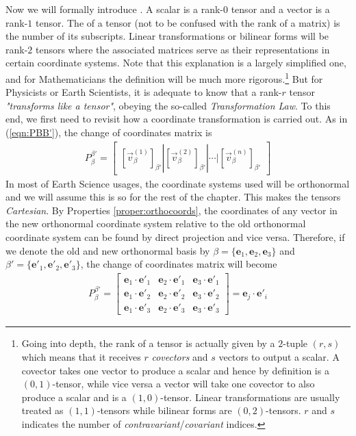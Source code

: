 Now we will formally introduce . A scalar is a rank-$0$ tensor and a vector is a rank-$1$ tensor. The  of a tensor (not to be confused with the rank of a matrix) is the number of its subscripts. Linear transformations or bilinear forms will be rank-$2$ tensors where the associated matrices serve as their representations in certain coordinate systems. Note that this explanation is a largely simplified one, and for Mathematicians the definition will be much more rigorous.\footnote{\label{foot:rstensor}Going into depth, the rank of a tensor is actually given by a $2$-tuple $(r,s)$ which means that it receives $r$ \textit{covectors} and $s$ vectors to output a scalar. A covector takes one vector to produce a scalar and hence by definition is a $(0,1)$-tensor, while vice versa a vector will take one covector to also produce a scalar and is a $(1,0)$-tensor. Linear transformations are usually treated as $(1,1)$-tensors while bilinear forms are $(0,2)$-tensors. $r$ and $s$ indicates the number of \textit{contravariant}/\textit{covariant} indices.} But for Physicists or Earth Scientists, it is adequate to know that a rank-$r$ tensor \textit{"transforms like a tensor"}, obeying the so-called \textit{Transformation Law}. To this end, we first need to revisit how a coordinate transformation is carried out. As in (\ref{eqn:PBB'}), the change of coordinates matrix is
\begin{align}
P_\beta^{\beta'} = \begin{bmatrix}
[\vec{v}_\beta^{(1)}]_{\beta'} | [\vec{v}_\beta^{(2)}]_{\beta'} | \cdots | [\vec{v}_\beta^{(n)}]_{\beta'}
\end{bmatrix}
\end{align}
In most of Earth Science usages, the coordinate systems used will be orthonormal and we will assume this is so for the rest of the chapter. This makes the tensors \textit{Cartesian}. By Properties \ref{proper:orthocoords}, the coordinates of any vector in the new orthonormal coordinate system relative to the old orthonormal coordinate system can be found by direct projection and vice versa. Therefore, if we denote the old and new orthonormal basis by $\beta = \{\textbf{e}_1, \textbf{e}_2, \textbf{e}_3\}$ and $\beta'= \{\textbf{e}'_1, \textbf{e}'_2, \textbf{e}'_3\}$, the change of coordinates matrix will become
\begin{align}
P_\beta^{\beta'} = \begin{bmatrix}
\textbf{e}_1 \cdot \textbf{e}'_1 & \textbf{e}_2 \cdot \textbf{e}'_1 & \textbf{e}_3 \cdot \textbf{e}'_1 \\
\textbf{e}_1 \cdot \textbf{e}'_2 & \textbf{e}_2 \cdot \textbf{e}'_2 & \textbf{e}_3 \cdot \textbf{e}'_2 \\
\textbf{e}_1 \cdot \textbf{e}'_3 & \textbf{e}_2 \cdot \textbf{e}'_3 & \textbf{e}_3 \cdot \textbf{e}'_3 
\end{bmatrix}
= \textbf{e}_j \cdot \textbf{e}'_i
\label{eqn:Peeij}
\end{align}
